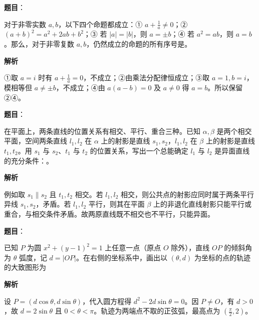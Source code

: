 \begin{answer}

\textbf{题目}：

对于非零实数 $a,b$，以下四个命题都成立：① $a+\frac1a\ne0$；② $(a+b)^2=a^2+2ab+b^2$；③ 若 $|a|=|b|$，则 $a=\pm b$；④ 若 $a^2=ab$，则 $a=b$。那么，对于非零复数 $a,b$，仍然成立的命题的所有序号是\gkblank{}。

\textbf{解析}

①取 $a=i$ 时有 $a+\frac1a=0$，不成立；②由乘法分配律恒成立；③取 $a=1,b=i$，模相等但 $a\ne\pm b$，不成立；④由 $a(a-b)=0$ 及 $a\ne0$ 得 $a=b$。所以保留②④。


\end{answer}
\begin{answer}

\textbf{题目}：

在平面上，两条直线的位置关系有相交、平行、重合三种。已知 $\alpha,\beta$ 是两个相交平面，空间两条直线 $l_1,l_2$ 在 $\alpha$ 上的射影是直线 $s_1,s_2$，$l_1,l_2$ 在 $\beta$ 上的射影是直线 $t_1,t_2$。用 $s_1$ 与 $s_2$、$t_1$ 与 $t_2$ 的位置关系，写出一个总能确定 $l_1$ 与 $l_2$ 是异面直线的充分条件：\gkblank{}。

\textbf{解析}

例如取 $s_1\parallel s_2$ 且 $t_1,t_2$ 相交。若 $l_1,l_2$ 相交，则公共点的射影应同时属于两条平行异线 $s_1,s_2$，矛盾。若 $l_1,l_2$ 平行，则其在平面 $\beta$ 上的非退化直线射影只能平行或重合，与相交条件矛盾。故两原直线既不相交也不平行，只能异面。


\end{answer}
\begin{answer}

\textbf{题目}：

已知 $P$ 为圆 $x^2+(y-1)^2=1$ 上任意一点（原点 $O$ 除外），直线 $OP$ 的倾斜角为 $\theta$ 弧度，记 $d=|OP|$。在右侧的坐标系中，画出以 $(\theta,d)$ 为坐标的点的轨迹的大致图形为 
\nopagebreak[4]
\begin{center}\end{center}
\nopagebreak[4]
\textbf{解析}

设 $P=(d\cos\theta,d\sin\theta)$，代入圆方程得 $d^2-2d\sin\theta=0$。因 $P\ne O$，有 $d>0$，故 $d=2\sin\theta$ 且 $0<\theta<\pi$。轨迹为两端点不取的正弦弧，最高点为 $(\frac\pi2,2)$。


\end{answer}
